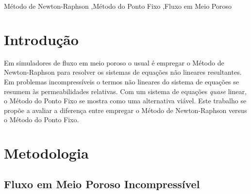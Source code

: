 \documentclass[final,5p]{elsarticle}
\numberwithin{equation}{section}
\begin{document}
\begin{frontmatter}
\begin{abstract}
\end{abstract}




\begin{keyword}
    Método de Newton-Raphson \sep Método do Ponto Fixo \sep Fluxo em Meio Poroso



\end{keyword}

\end{frontmatter}


\section{Introdução}

        Em simuladores de fluxo em meio poroso o usual é empregar o Método de Newton-Raphson para resolver os sistemas de equações não lineares resultantes\cite{computer2022cmg}\cite{schlumberger2009technical}. Em problemas incompressíveis o termos não lineares do sistema de equações se resumem às permeabilidades relativas. Com um sistema de equações \emph{quase} linear, o Método do Ponto Fixo se mostra como uma alternativa viável. Este trabalho se propõe a avaliar a diferença entre empregar o Método de Newton-Raphson versus o Método do Ponto Fixo.

\section{Metodologia}

    \subsection{Fluxo em Meio Poroso Incompressível}
\end{document}
